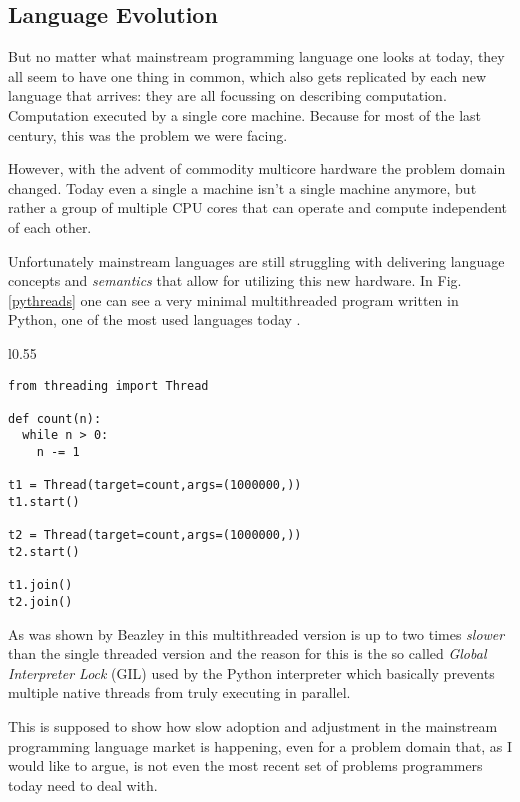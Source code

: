 \subsection{Language Evolution}
\label{LanguageEvolution}

But no matter what mainstream programming language one looks at today,
they all seem to have one thing in common, which also gets replicated
by each new language that arrives: they are all focussing on
describing computation. Computation executed by a single core machine.
Because for most of the last century, this was the problem we were
facing.

However, with the advent of commodity multicore hardware
\cite{core2duo} the problem domain changed. Today even a single a machine
isn't a single machine anymore, but rather a group of multiple CPU cores
that can operate and compute independent of each other.

Unfortunately mainstream languages are still struggling with delivering
language concepts and \textit{semantics} that allow for utilizing this new
hardware. In Fig.\ref{pythreads} one can see a very minimal multithreaded
program written in Python, one of the most used languages today
\cite{langrank}.


\begin{wrapfigure}{l}{0.55\textwidth}
    \begin{lstlisting}
from threading import Thread

def count(n):
  while n > 0:
    n -= 1

t1 = Thread(target=count,args=(1000000,))
t1.start()

t2 = Thread(target=count,args=(1000000,))
t2.start()

t1.join()
t2.join()
    \end{lstlisting}
  \caption{Python multithreading example}
  \label{pythreads}
\end{wrapfigure}

As was shown by Beazley in \cite{pygil} this multithreaded version is up to
two times \textit{slower} than the single threaded version and the
reason for this is the so called \textit{Global Interpreter Lock}
(GIL) used by the Python interpreter which basically prevents multiple
native threads from truly executing in parallel.

This is supposed to show how slow adoption and adjustment in the mainstream
programming language market is happening, even for a problem domain that,
as I would like to argue, is not even the most recent set of problems
programmers today need to deal with.

